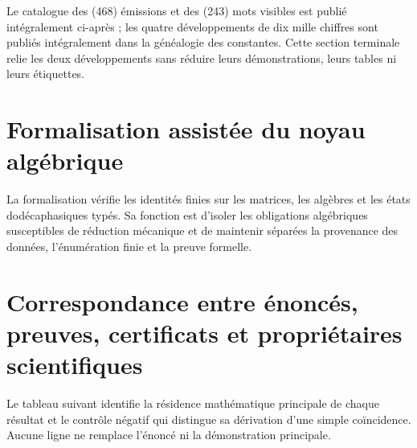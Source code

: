 Le catalogue des (468) émissions et des (243) mots visibles est publié
intégralement ci-après ; les quatre développements de dix mille chiffres sont
publiés intégralement dans la généalogie des constantes. Cette section terminale
relie les deux développements sans réduire leurs démonstrations, leurs tables ni leurs étiquettes.

\begin{HMTScientificOwnerSubordinated}

\end{HMTScientificOwnerSubordinated}




\chapter{Formalisation assistée du noyau algébrique}
\label{app:formalizacion-asistida-acumulativa}

La formalisation vérifie les identités finies sur les matrices, les algèbres et les
états dodécaphasiques typés. Sa fonction est d'isoler les obligations
algébriques susceptibles de réduction mécanique et de maintenir séparées la
provenance des données, l'énumération finie et la preuve formelle.

\HMTDemoteHeadings

\HMTRestoreHeadings

\chapter{Correspondance entre énoncés, preuves, certificats et propriétaires scientifiques}
\label{app:indice-resultados-fuentes-acumulativo}

Le tableau suivant identifie la résidence mathématique principale de chaque
résultat et le contrôle négatif qui distingue sa dérivation d'une simple
coïncidence. Aucune ligne ne remplace l'énoncé ni la démonstration principale.

